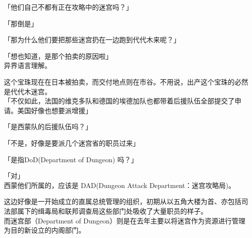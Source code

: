 「他们自己不都有正在攻略中的迷宫吗？」

「那倒是」

「那为什么他们要把那些迷宫扔在一边跑到代代木来呢？」

「想也知道，是那个拍卖的原因啦」\\

异界语言理解。

这个宝珠现在在日本被拍卖，而交付地点则在市谷。不用说，出产这个宝珠的必然是代代木迷宫。\\

「不仅如此，法国的维克多队和德国的埃德加队也都带着后援队伍全部提交了申请。美国好像也想要派增援」

「是西蒙队的后援队伍吗？」

「不是，好像是要派几个迷宫省的职员过来」

「是指DoD(Department of Dungeon) 吗？」

「对」\\

西蒙他们所属的，应该是 DAD(Dungeon Attack Department：迷宫攻略局)。

这边好像是一开始成立的直属总统管理的组织，初期从以五角大楼为首、亦包括司法部属下的缉毒局和联邦调查局这些部门处吸收了大量职员的样子。\\

而迷宫部（Department of Dungeon）则是在去年主要以将迷宫作为资源进行管理为目的新设立的内阁部门。

